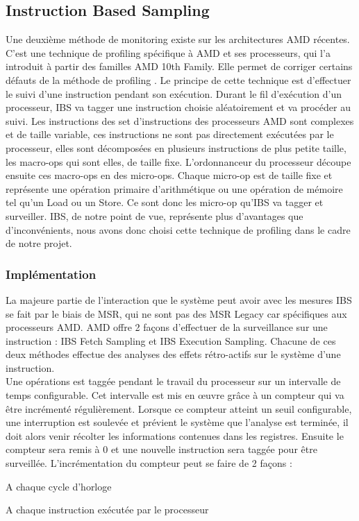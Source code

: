 	\subsection{Instruction Based Sampling}
		Une deuxième méthode de monitoring existe sur les architectures AMD récentes. C'est une technique de profiling spécifique à AMD et ses processeurs, qui l'a introduit à partir des familles AMD 10th Family. Elle permet de corriger certains défauts de la méthode de profiling \PMC. Le principe de cette technique est d'effectuer le suivi d'une instruction pendant son exécution. Durant le fil d'exécution d'un processeur, IBS va tagger une instruction choisie aléatoirement et va procéder au suivi. Les instructions des set d'instructions des processeurs AMD sont complexes et de taille variable, ces instructions ne sont pas directement exécutées par le processeur, elles sont décomposées en plusieurs instructions de plus petite taille, les macro-ops qui sont elles, de taille fixe. L'ordonnanceur du processeur découpe ensuite ces macro-ops en des micro-ops. Chaque micro-op est de taille fixe et représente une opération primaire d'arithmétique ou une opération de mémoire tel qu'un Load ou un Store. Ce sont donc les micro-op qu'IBS va tagger et surveiller. IBS, de notre point de vue, représente plus d'avantages que d'inconvénients, nous avons donc choisi cette technique de profiling dans le cadre de notre projet.
		\subsubsection{Implémentation}
			La majeure partie de l'interaction que le système peut avoir avec les mesures IBS se fait par le biais de MSR, qui ne sont pas des MSR Legacy car spécifiques aux processeurs AMD. AMD offre 2 façons d'effectuer de la surveillance sur une instruction : IBS Fetch Sampling et IBS Execution Sampling. Chacune de ces deux méthodes effectue des analyses des effets rétro-actifs sur le système d'une instruction. \\
			Une opérations est taggée pendant le travail du processeur sur un intervalle de temps configurable. Cet intervalle est mis en \oe uvre grâce à un compteur qui va être incrémenté régulièrement. Lorsque ce compteur atteint un seuil configurable, une interruption est soulevée et prévient le système que l'analyse est terminée, il doit alors venir récolter les informations contenues dans les registres. Ensuite le compteur sera remis à 0 et une nouvelle instruction sera taggée pour être surveillée. L'incrémentation du compteur peut se faire de 2 façons : 
			\bitem
				\item{A chaque cycle d'horloge}
				\item{A chaque instruction exécutée par le processeur}

